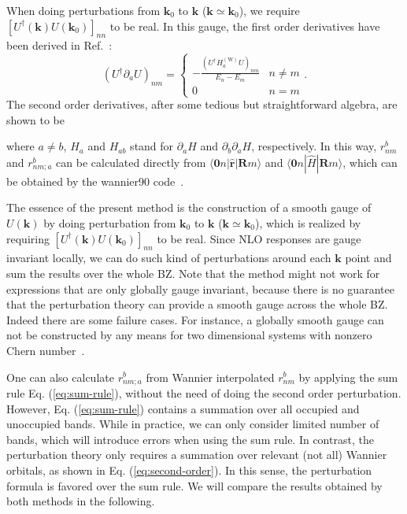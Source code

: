 When doing perturbations from $\mathbf{k}_{0}$ to $\mathbf{k}$ ($\mathbf{k}\simeq\mathbf{k}_{0}$), we require $[U^{\dagger}(\mathbf{k})U(\mathbf{k}_{0})]_{nn}$ to be real. In this gauge, the first order derivatives have been derived in Ref.~:
\[
(U^{\dagger}\partial_{a}U)_{nm}=\begin{cases}
-\frac{(U^{\dagger}H_{a}^{(\textrm{W})}U)_{nm}}{E_{n}-E_{m}} & n\neq m\\
0 & n=m
\end{cases}.
\]
The second order derivatives, after some tedious but straightforward algebra, are shown to be 

where $a\ne b$, $H_{a}$ and $H_{ab}$ stand for $\partial_{a}H$ and $\partial_{b}\partial_{a}H$, respectively. In this way, $r_{nm}^{b}$ and $r_{nm;a}^{b}$ can be calculated directly from $\langle\mathbf{0}n|\hat{\mathbf{r}}|\mathbf{R}m\rangle$ and $\langle\mathbf{0}n|\hat{H}|\mathbf{R}m\rangle$, which can be obtained by the wannier90 code~\cite{mostofi_updated_2014}. 

The essence of the present method is the construction of a smooth gauge of $U(\mathbf{k})$ by doing perturbation from $\mathbf{k}_{0}$ to $\mathbf{k}$ ($\mathbf{k}\simeq\mathbf{k}_{0}$), which is realized by requiring $[U^{\dagger}(\mathbf{k})U(\mathbf{k}_{0})]_{nn}$ to be real. Since NLO responses are gauge invariant locally, we can do such kind of perturbations around each $\mathbf{k}$ point and sum the results over the whole BZ. Note that the method might not work for expressions that are only globally gauge invariant, because there is no guarantee that the perturbation theory can provide a smooth gauge across the whole BZ. Indeed there are some failure cases. For instance, a globally smooth gauge can not be constructed by any means for two dimensional systems with nonzero Chern number~\cite{b._andrei_bernevig_topological_2013}.

One can also calculate $r_{nm;a}^{b}$ from Wannier interpolated $r_{nm}^{b}$ by applying the sum rule Eq. (\ref{eq:sum-rule}), without the need of doing the second order perturbation. However, Eq. (\ref{eq:sum-rule}) contains a summation over all occupied and unoccupied bands. While in practice, we can only consider limited number of bands, which will introduce errors when using the sum rule. In contrast, the perturbation theory only requires a summation over relevant (not all) Wannier orbitals, as shown in Eq. (\ref{eq:second-order}). In this sense, the perturbation formula is favored over the sum rule. We will compare the results obtained by both methods in the following.